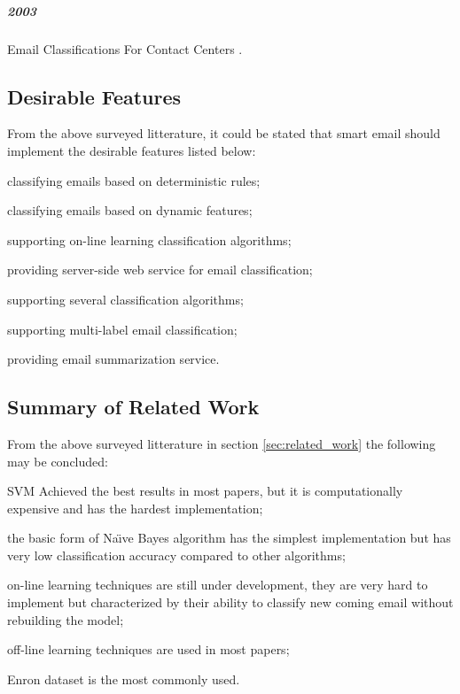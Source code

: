 \subparagraph*{2003}
\begin{my_itemize}
  \item Email Classifications For Contact Centers \cite{ANI03}.
\end{my_itemize}

\subsection{Desirable Features}
\label{desirable_features}
From the above surveyed litterature, it could be stated that smart email should implement the desirable features listed below:
\begin{my_itemize}
  \item classifying emails based on deterministic rules; \cite{YAHOO_FILTERS} \cite{GMAIL_FILTERS}
  \item classifying emails based on dynamic features; \cite{Sebastiani2002} \cite{RON04}
  \item supporting on-line learning classification algorithms; \cite{JOSE11}
  \item providing server-side web service for email classification;
  \item supporting several classification algorithms; \cite{Sebastiani2002}
  \item supporting multi-label email classification; \cite{sift02} \cite{Carmona2011}
  \item providing email summarization service.
\end{my_itemize}

\subsection{Summary of Related Work}
From the above surveyed litterature in section \ref{sec:related_work} the following may be concluded:
\begin{my_itemize}
    \item SVM Achieved the best results in most papers, but it is computationally 
    expensive and has the hardest implementation;
    \item the basic form of Na\"{\i}ve Bayes algorithm has the simplest implementation 
    but has very low classification accuracy compared to other algorithms;
    \item on-line learning techniques are still under development, they are very 
    hard to implement but characterized by their ability to classify new coming 
    email without rebuilding the model;
    \item off-line learning techniques are used in most papers;
    \item Enron dataset \cite{ENRON} is the most commonly used.
\end{my_itemize}

